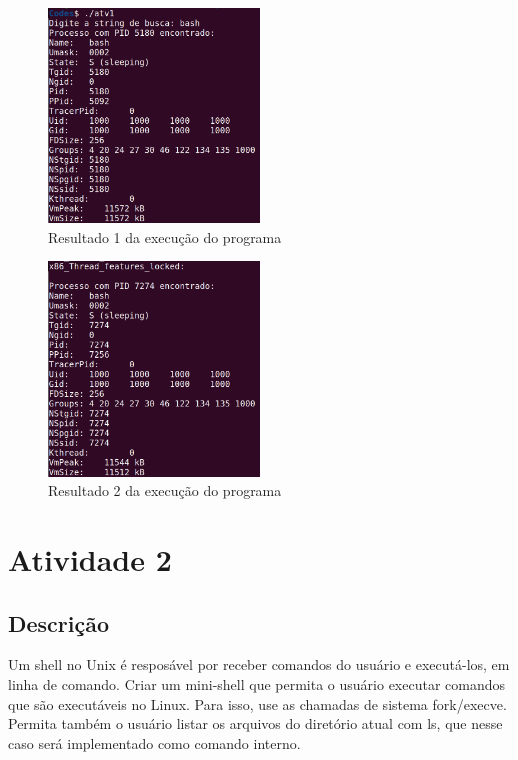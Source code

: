\documentclass{article}
\begin{document}
\begin{figure}[ht]
    \centering
    \includegraphics[width=0.5\textwidth]{./Images/atv1_result1.png}
    \caption{Resultado 1 da execução do programa}
    \label{fig:atv1_result1}
\end{figure}

\begin{figure}[ht]
    \centering
    \includegraphics[width=0.5\textwidth]{./Images/atv1_result2.png}
    \caption{Resultado 2 da execução do programa}
    \label{fig:atv1_result2}
\end{figure}
\newpage

\section{Atividade 2}
\subsection{Descrição}
Um shell no Unix é resposável por receber comandos do usuário e executá-los, em linha de comando. Criar um mini-shell que permita o usuário executar comandos que são executáveis no Linux. Para isso, use as chamadas de sistema fork/execve. Permita também o usuário listar os arquivos do diretório atual com ls, que nesse caso será implementado como comando interno.
\end{document}
